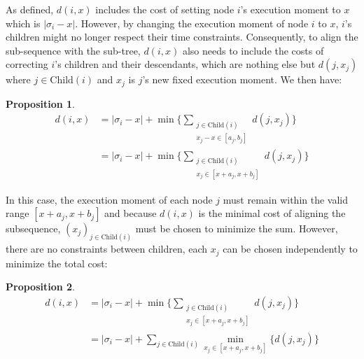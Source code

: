 \documentclass{article}
\newtheorem{proposition}{Proposition}
\begin{document}
As defined, $d(i,x)$ includes the cost of setting node $i$'s execution moment to $x$ which is $|\sigma_i - x|$. However, by changing the execution moment of node $i$ to $x$, $i$'s children might no longer respect their time constraints. Consequently, to align the sub-sequence with the sub-tree, $d(i,x)$ also needs to include the costs of correcting $i$'s children and their descendants, which are nothing else but $d(j,x_j)$ where $j \in \text{Child}(i)$ and $x_j$ is $j$'s new fixed execution moment. We then have: 

\begin{proposition}
    \begin{equation}
        \begin{split}
            d(i,x) & = |\sigma_{i}-x| + \min\Biggl\{\sum_{\substack{j \in \text{Child}(i) \\ x_{j}-x\in[a_{j},b_{j}]}}d(j,x_{j})\Biggr\} \\
            & = |\sigma_{i}-x| + \min\Biggl\{\sum_{\substack{j \in \text{Child}(i) \\ x_{j}\in[x+a_{j},x+b_{j}]}}d(j,x_{j})\Biggr\}
        \end{split}
    \end{equation}
\end{proposition}

In this case, the execution moment of each node $j$ must remain within the valid range $[x+a_{j}, x+b_{j}]$ and because $d(i,x)$ is the minimal cost of aligning the subsequence, $(x_{j})_{j \in \text{Child}(i)}$ must be chosen to minimize the sum. However, there are no constraints between children, each $x_{j}$ can be chosen independently to minimize the total cost:

\begin{proposition}
    \begin{equation}
        \begin{split}
            d(i,x) & = |\sigma_{i}-x| + \min\Biggl\{\sum_{\substack{j \in \text{Child}(i) \\ x_{j}\in[x+a_{j},x+b_{j}]}}d(j,x_{j})\Biggr\} \\
            & = |\sigma_{i}-x| + \sum_{j \in \text{Child}(i)}\min_{x_{j}\in[x+a_{j},x+b_{j}]}\{d(j,x_{j})\}\\
        \end{split}
    \end{equation}
\end{proposition}

\end{document}
